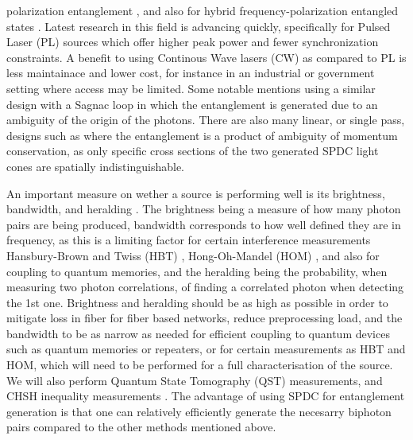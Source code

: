 \documentclass{article}
\theoremstyle{mytheoremstyle}
\theoremstyle{mytheoremstyle}
\theoremstyle{myproblemstyle}
\begin{document}
polarization entanglement \cite{L_Z_F_F_L_L_W_R_D_X_etal._2017}, and also for hybrid frequency-polarization
entangled states \cite{F_R_D_F_L_M_A_B_D_2023}. Latest research in this field is advancing quickly, specifically for
Pulsed Laser (PL) sources which offer higher peak power and fewer synchronization constraints.
A benefit to using Continous Wave lasers (CW) as compared to PL is less maintainace and lower cost, for instance in an industrial or government
setting where access may be limited. Some notable mentions using a similar design with a Sagnac loop
\cite{Neumann_Buchner_Bulla_Bohmann_Ursin_2022_CW,Chen_Ecker_Wengerowsky_Bulla_Joshi_Steinlechner_Ursin_2018_CW}
in which the entanglement is generated due to an ambiguity of the origin of the photons.
There are also many linear, or single pass, designs such as \cite{Lee_Kim_Cha_Moon_2016,Kwiat_Mattle_Weinfurter_Zeilinger_Sergienko_Shih_1995}
where the entanglement is a product of ambiguity of momentum conservation, as only specific cross sections of the two generated SPDC light
cones are spatially indistinguishable.
\par An important measure on wether a source is performing well is its brightness, bandwidth, and heralding \cite{Bennink_2010,Ljunggren_Tengner_Marsden_Pelton_2006}.
The brightness being a measure of how many photon pairs are being produced, bandwidth corresponds to how well defined they are in frequency,
as this is a limiting factor for certain interference measurements Hansbury-Brown and Twiss (HBT) \cite{Brown_Twiss_1954},
Hong-Oh-Mandel (HOM) \cite{Hong_Ou_Mandel_1987}, and also for coupling to quantum memories,
and the heralding being the probability, when measuring two photon correlations, of finding a correlated photon when detecting the 1st one.
Brightness and heralding should be as high as possible in order to mitigate loss in fiber for fiber based networks,
reduce preprocessing load, and the bandwidth to be as narrow as needed for efficient coupling to quantum devices such as quantum memories or repeaters,
or for certain measurements as HBT and HOM, which will need to be performed for a full characterisation of the source.
We will also perform Quantum State Tomography (QST) measurements, and CHSH inequality measurements \cite{Clauser_Horne_Shimony_Holt_1969}.
The advantage of using SPDC for entanglement generation is that one can relatively efficiently generate the necesarry biphoton pairs
compared to the other methods mentioned above.

\cite{Halder_Beveratos_Jorel_Zbinden_Simon_Scarani_Gisin_2007,Samara_Maring_Martin_Raja_Kippenberg_Zbinden_Thew_2021,Tsujimoto_Tanaka_Iwasaki_Ikuta_Miki_Yamashita_Terai_Yamamoto_Koashi_Imoto_2018}
\end{document}
